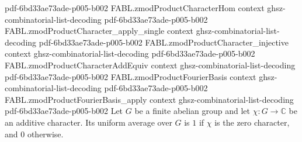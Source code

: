 \begin{theorem}
  {pdf-6bd33ae73ade-p005-b002}
\proofstep
  {FABL.zmodProductCharacterHom}
  {context}
  {ghsz-combinatorial-list-decoding}
  {pdf-6bd33ae73ade-p005-b002}
\proofstep
  {FABL.zmodProductCharacter_apply_single}
  {context}
  {ghsz-combinatorial-list-decoding}
  {pdf-6bd33ae73ade-p005-b002}
\proofstep
  {FABL.zmodProductCharacter_injective}
  {context}
  {ghsz-combinatorial-list-decoding}
  {pdf-6bd33ae73ade-p005-b002}
\proofstep
  {FABL.zmodProductCharacterAddEquiv}
  {context}
  {ghsz-combinatorial-list-decoding}
  {pdf-6bd33ae73ade-p005-b002}
\proofstep
  {FABL.zmodProductFourierBasis}
  {context}
  {ghsz-combinatorial-list-decoding}
  {pdf-6bd33ae73ade-p005-b002}
\proofstep
  {FABL.zmodProductFourierBasis_apply}
  {context}
  {ghsz-combinatorial-list-decoding}
  {pdf-6bd33ae73ade-p005-b002}
Let $G$ be a finite abelian group and let $\chi:G\to\mathbb C$ be an additive
character. Its uniform average over $G$ is $1$ if $\chi$ is the zero character, and $0$
otherwise.
\end{theorem}

